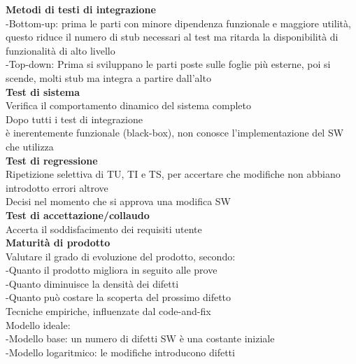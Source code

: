 \documentclass{article}
\begin{document}
				\textbf{Metodi di testi di integrazione}\\
				-Bottom-up: prima le parti con minore dipendenza funzionale e maggiore utilità, questo riduce il numero di stub necessari al test ma ritarda la disponibilità di funzionalità di alto livello\\
				-Top-down: Prima si sviluppano le parti poste sulle foglie più esterne, poi si scende, molti stub ma integra a partire dall'alto\\
				
				\textbf{Test di sistema}\\
				Verifica il comportamento dinamico del sistema completo\\
				Dopo tutti i test di integrazione\\
				è inerentemente funzionale (black-box), non conosce l'implementazione del SW che utilizza\\
				
				\textbf{Test di regressione}\\
				Ripetizione selettiva di TU, TI e TS, per accertare che modifiche non abbiano introdotto errori altrove\\
				Decisi nel momento che si approva una modifica SW\\
				
				\textbf{Test di accettazione/collaudo}\\
				Accerta il soddisfacimento dei requisiti utente\\
				
				\textbf{Maturità di prodotto}\\
				Valutare il grado di evoluzione del prodotto, secondo:\\
				-Quanto il prodotto migliora in seguito alle prove\\
				-Quanto diminuisce la densità dei difetti\\
				-Quanto può costare la scoperta del prossimo difetto\\
				Tecniche empiriche, influenzate dal code-and-fix\\
				Modello ideale:\\
				-Modello base: un numero di difetti SW è una costante iniziale\\
				-Modello logaritmico: le modifiche introducono difetti
\end{document}
